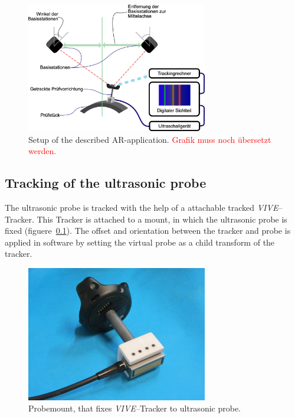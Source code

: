 \documentclass{VRARWorkshop}
\begin{document}
\begin{figure}[h!]
    \begin{center}
        \includegraphics[width=79mm]{images/Setup.eps}
        \caption{\label{fig:Setup} Setup of the described AR-application. \textcolor{red}{Grafik muss noch übersetzt werden.}}
    \end{center}
\end{figure}

\subsection{Tracking of the ultrasonic probe}
The ultrasonic probe is tracked with the help of a attachable tracked \textit{VIVE}--Tracker.
This Tracker is attached to a mount, in which the ultrasonic probe is fixed (figuere~\ref{}).
The offset and orientation between the tracker and probe is applied in software by setting the virtual probe as a child transform of the tracker.

\begin{figure}[h!]
    \begin{center}
        \includegraphics[width=79mm]{images/probemount.jpg}
        \caption{\label{fig:probemount} Probemount, that fixes \textit{VIVE--}Tracker to ultrasonic probe.}
    \end{center}
\end{figure}
\end{document}
